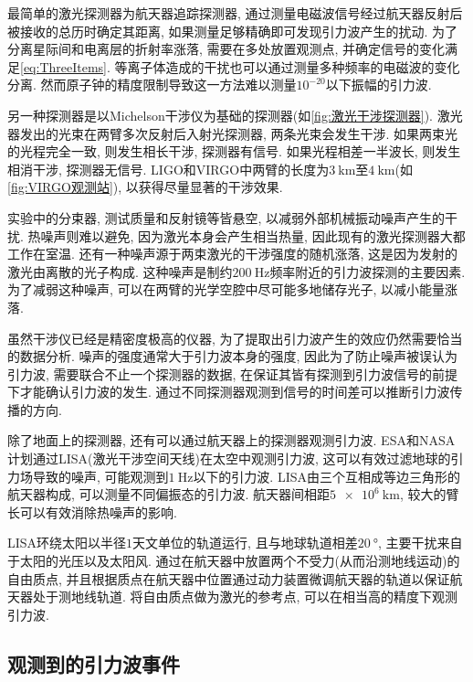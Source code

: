 \documentclass[hidelinks]{ctexart}
\begin{document}
最简单的激光探测器为航天器追踪探测器, 通过测量电磁波信号经过航天器反射后被接收的总历时确定其距离, 如果测量足够精确即可发现引力波产生的扰动. 为了分离星际间和电离层的折射率涨落, 需要在多处放置观测点, 并确定信号的变化满足\eqref{eq:ThreeItems}. 等离子体造成的干扰也可以通过测量多种频率的电磁波的变化分离. 然而原子钟的精度限制导致这一方法难以测量$10^{-20}$以下振幅的引力波.
\par
另一种探测器是以Michelson干涉仪为基础的探测器(如\cref{fig:激光干涉探测器}). 激光器发出的光束在两臂多次反射后入射光探测器, 两条光束会发生干涉. 如果两束光的光程完全一致, 则发生相长干涉, 探测器有信号. 如果光程相差一半波长, 则发生相消干涉, 探测器无信号. LIGO和VIRGO中两臂的长度为$\SI{3}{\kilo\meter}$至$\SI{4}{\kilo\meter}$(如\cref{fig:VIRGO观测站}), 以获得尽量显著的干涉效果.
\par
实验中的分束器, 测试质量和反射镜等皆悬空, 以减弱外部机械振动噪声产生的干扰. 热噪声则难以避免, 因为激光本身会产生相当热量, 因此现有的激光探测器大都工作在室温. 还有一种噪声源于两束激光的干涉强度的随机涨落, 这是因为发射的激光由离散的光子构成. 这种噪声是制约$\SI{200}{\hertz}$频率附近的引力波探测的主要因素. 为了减弱这种噪声, 可以在两臂的光学空腔中尽可能多地储存光子, 以减小能量涨落.
\par
虽然干涉仪已经是精密度极高的仪器, 为了提取出引力波产生的效应仍然需要恰当的数据分析. 噪声的强度通常大于引力波本身的强度, 因此为了防止噪声被误认为引力波, 需要联合不止一个探测器的数据, 在保证其皆有探测到引力波信号的前提下才能确认引力波的发生. 通过不同探测器观测到信号的时间差可以推断引力波传播的方向.
\par
除了地面上的探测器, 还有可以通过航天器上的探测器观测引力波. ESA和NASA计划通过LISA(激光干涉空间天线)在太空中观测引力波, 这可以有效过滤地球的引力场导致的噪声, 可能观测到$\SI{1}{\hertz}$以下的引力波. LISA由三个互相成等边三角形的航天器构成, 可以测量不同偏振态的引力波. 航天器间相距$\SI{5e6}{\kilo\meter}$, 较大的臂长可以有效消除热噪声的影响.
\par
LISA环绕太阳以半径$1$天文单位的轨道运行, 且与地球轨道相差$\SI{20}{\degree}$, 主要干扰来自于太阳的光压以及太阳风. 通过在航天器中放置两个不受力(从而沿测地线运动)的自由质点, 并且根据质点在航天器中位置通过动力装置微调航天器的轨道以保证航天器处于测地线轨道. 将自由质点做为激光的参考点, 可以在相当高的精度下观测引力波.



\subsection{观测到的引力波事件} %
\label{sub:观测到的引力波事件}
\end{document}
